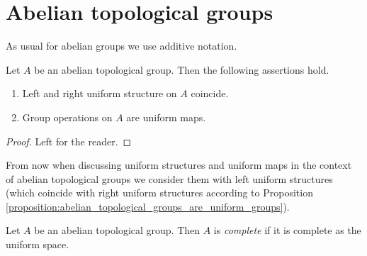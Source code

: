 \documentclass[10pt]{amsart}
\begin{document}
\section{Abelian topological groups}
\noindent
As usual for abelian groups we use additive notation.

\begin{proposition}\label{proposition:abelian_topological_groups_are_uniform_groups}
	Let $A$ be an abelian topological group. Then the following assertions hold.
	\begin{enumerate}[label=\emph{\textbf{(\arabic*)}}, leftmargin=3.0em]
		\item Left and right uniform structure on $A$ coincide.
		\item Group operations on $A$ are uniform maps.
	\end{enumerate}
\end{proposition}
\begin{proof}
	Left for the reader.
\end{proof}
\noindent
From now when discussing uniform structures and uniform maps in the context of abelian topological groups we consider them with left uniform structures (which coincide with right uniform structures according to Proposition \ref{proposition:abelian_topological_groups_are_uniform_groups}).

\begin{definition}
	Let $A$ be an abelian topological group. Then $A$ is \textit{complete} if it is complete as the uniform space.
\end{definition}
\end{document}
